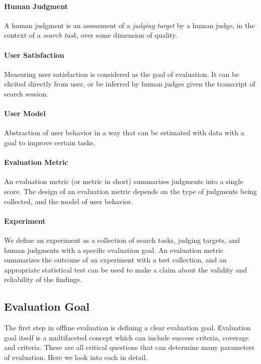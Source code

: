 \paragraph{Human Judgment} A human judgment is an assessment of a \textit{judging target} by a human judge, in the context of a \textit{search task}, over some dimension of quality. 

\paragraph{User Satisfaction} Measuring user satisfaction is considered as the goal of evaluation. It can be elicited directly from user, or be inferred by human judges given the transcript of search session.

\paragraph{User Model}  Abstraction of user behavior in a way that can be estimated with data with a goal to improve certain tasks. 

\paragraph{Evaluation Metric} An evaluation metric (or metric in short) summarizes judgments into a single score. The design of an evaluation metric depends on the type of judgments being collected, and the model of user behavior.

\paragraph{Experiment} We define an experiment as a collection of search tasks, judging targets, and human judgments with a specific evaluation goal. An evaluation metric summarizes the outcome of an experiment with a test collection, and an appropriate statistical test can be used to make a claim about the validity and reliability of the findings.

\subsection{Evaluation Goal}
The first step in offline evaluation is defining a clear evaluation goal. Evaluation goal itself is a multifaceted concept which can include success criteria, coverage and criteria. These are all critical questions that can determine many parameters of evaluation. Here we look into each in detail.

